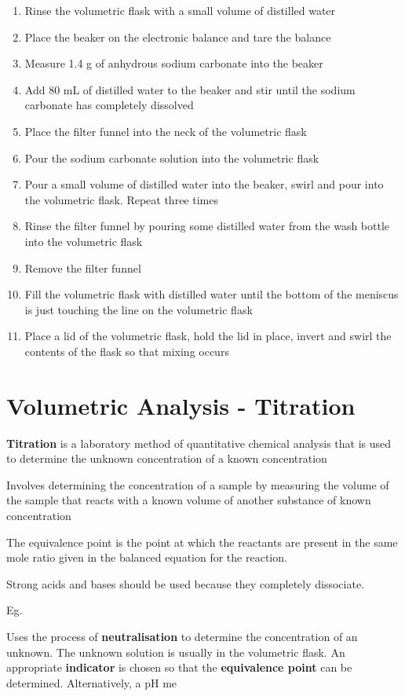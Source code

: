 		\begin{enumerate}
			\item Rinse the volumetric flask with a small volume of distilled water
			\item Place the beaker on the electronic balance and tare the balance
			\item Measure 1.4 g of anhydrous sodium carbonate into the beaker
			\item Add 80 mL of distilled water to the beaker and stir until the sodium carbonate has completely dissolved
			\item Place the filter funnel into the neck of the volumetric flask
			\item Pour the sodium carbonate solution into the volumetric flask
			\item Pour a small volume of distilled water into the beaker, swirl and pour into the volumetric flask. Repeat three times
			\item Rinse the filter funnel by pouring some distilled water from the wash bottle into the volumetric flask
			\item Remove the filter funnel
			\item Fill the volumetric flask with distilled water until the bottom of the meniscus is just touching the line on the volumetric flask
			\item Place a lid of the volumetric flask, hold the lid in place, invert and swirl the contents of the flask so that mixing occurs
		\end{enumerate}

\section{Volumetric Analysis - Titration}

	\textbf{Titration} is a laboratory method of quantitative chemical analysis that is used to determine the unknown concentration of a known concentration

	Involves determining the concentration of a sample by measuring the volume of the sample that reacts with a known volume of another substance of known concentration

	The equivalence point is the point at which the reactants are present in the same mole ratio given in the balanced equation for the reaction.

	Strong acids and bases should be used because they completely dissociate.

	Eg.

	\begin{center}
	\end{center}

	Uses the process of \textbf{neutralisation} to determine the concentration of an unknown. The unknown solution is usually in the volumetric flask. An appropriate \textbf{indicator} is chosen so that the \textbf{equivalence point} can be determined. Alternatively, a pH me
